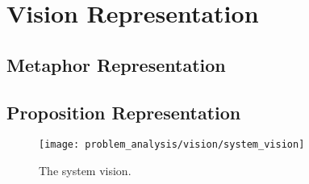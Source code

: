 \section{Vision Representation}
\subsection{Metaphor Representation}
\subsection{Proposition Representation}
\begin{figure}[!htbp]
    \centering
    \texttt{[image: problem\_analysis/vision/system\_vision]}
    \caption{The system vision.}
    \label{fig:system_vision}
\end{figure}
\FloatBarrier